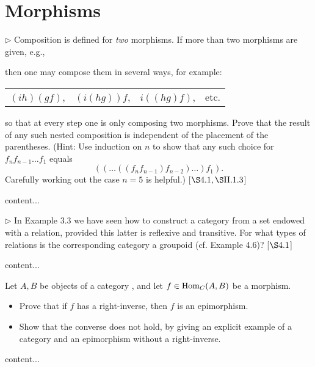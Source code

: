 \section{Morphisms}
\extitle

\begin{exercise}
	\(\triangleright\) Composition is defined for \textit{two} morphisms. If more than two morphisms are given, e.g., \vspace*{-0.4em}
	\begin{center}
	\end{center}
	then one may compose them in several ways, for example:
	\begin{center}
		\begin{tabular}{c c c c}
			\((ih)(gf)\), & \((i(hg))f\), & \(i((hg)f)\), & etc.
		\end{tabular}
	\end{center}
	so that at every step one is only composing two morphisms. Prove that the result of any such nested composition is independent of the placement of the parentheses. (Hint: Use induction on \(n\) to show that any such choice for \(f_n f_{n-1} \dots f_1\) equals
	\begin{equation*}
		((\dots ((f_n f_{n-1}) f_{n-2}) \dots )f_1).
	\end{equation*}
	Carefully working out the case \(n = 5\) is helpful.) [\(\S 4.1, \S \RNo{2}.1.3\)]
\end{exercise}
\begin{solution}
	content...
\end{solution}

\begin{exercise}
	\(\triangleright\) In Example 3.3 we have seen how to construct a category from a set endowed with a relation, provided this latter is reflexive and transitive. For what types of relations is the corresponding category a groupoid (cf. Example 4.6)? [\(\S 4.1\)]
\end{exercise}
\begin{solution}
	content...
\end{solution}

\begin{exercise}
	Let \(A, B\) be objects of a category , and let \(f \in \operatorname{Hom}_C(A,B)\) be a morphism.
	\begin{itemize}
		\item Prove that if \(f\) has a right-inverse, then \(f\) is an epimorphism.
		\item Show that the converse does not hold, by giving an explicit example of a category and an epimorphism without a right-inverse.
	\end{itemize}
\end{exercise}
\begin{solution}
	content...
\end{solution}

